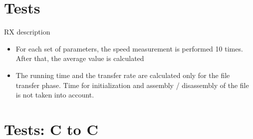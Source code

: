 \documentclass[10pt]{beamer}
\begin{document}
\section{Tests}


\begin{frame}[fragile]{RX description}
  \begin{itemize}
  	\footnotesize 	
    \item{} For each set of parameters, the speed measurement is performed 10 times. After that, the average value is calculated
    \item{} The running time and the transfer rate are calculated only for the file transfer phase. Time for initialization and assembly / disassembly of the file is not taken into account.
  \end{itemize}
\end{frame}


\section{Tests: C to C}
\end{document}
